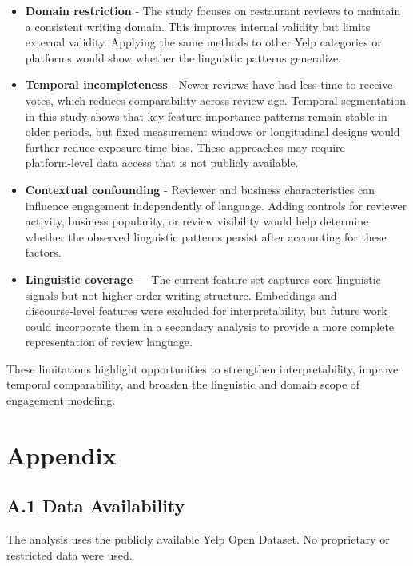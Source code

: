 \begin{itemize}
\item
  \textbf{Domain restriction} - The study focuses on restaurant reviews
  to maintain a consistent writing domain. This improves internal
  validity but limits external validity. Applying the same methods to
  other Yelp categories or platforms would show whether the linguistic
  patterns generalize.
\item
  \textbf{Temporal incompleteness} - Newer reviews have had less time to
  receive votes, which reduces comparability across review age. Temporal
  segmentation in this study shows that key feature‑importance patterns
  remain stable in older periods, but fixed measurement windows or
  longitudinal designs would further reduce exposure‑time bias. These
  approaches may require platform‑level data access that is not publicly
  available.
\item
  \textbf{Contextual confounding} - Reviewer and business
  characteristics can influence engagement independently of language.
  Adding controls for reviewer activity, business popularity, or review
  visibility would help determine whether the observed linguistic
  patterns persist after accounting for these factors.
\item
  \textbf{Linguistic coverage} --- The current feature set captures core
  linguistic signals but not higher‑order writing structure. Embeddings
  and discourse‑level features were excluded for interpretability, but
  future work could incorporate them in a secondary analysis to provide
  a more complete representation of review language.
\end{itemize}

These limitations highlight opportunities to strengthen
interpretability, improve temporal comparability, and broaden the
linguistic and domain scope of engagement modeling.

\hypertarget{appendix}{%
\section{Appendix}\label{appendix}}

\hypertarget{a.1-data-availability}{%
\subsection{A.1 Data Availability}\label{a.1-data-availability}}

The analysis uses the publicly available Yelp Open Dataset. No
proprietary or restricted data were used.

